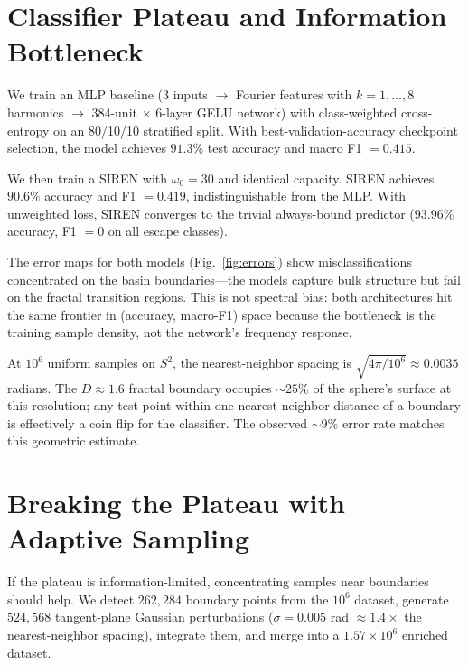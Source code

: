 \documentclass[twocolumn,prl]{revtex4-2}
\begin{document}
\section{Classifier Plateau and Information Bottleneck}
\label{sec:plateau}

We train an MLP baseline (3 inputs $\to$ Fourier features with $k =
1, \ldots, 8$ harmonics $\to$ 384-unit $\times$ 6-layer GELU network)
with class-weighted cross-entropy on an 80/10/10 stratified split. With
best-validation-accuracy checkpoint selection, the model achieves
$91.3\%$ test accuracy and macro F1 $= 0.415$.

We then train a SIREN \cite{Sitzmann2020} with $\omega_0 = 30$ and
identical capacity. SIREN achieves $90.6\%$ accuracy and F1 $= 0.419$,
indistinguishable from the MLP. With unweighted loss, SIREN converges to
the trivial always-bound predictor ($93.96\%$ accuracy, F1 $= 0$ on all
escape classes).

The error maps for both models (Fig.~\ref{fig:errors}) show
misclassifications concentrated on the basin boundaries---the models
capture bulk structure but fail on the fractal transition regions. This
is not spectral bias: both architectures hit the same frontier in
(accuracy, macro-F1) space because the bottleneck is the training sample
density, not the network's frequency response.

At $10^6$ uniform samples on $S^2$, the nearest-neighbor spacing is
$\sqrt{4\pi/10^6} \approx 0.0035$ radians. The $D \approx 1.6$ fractal
boundary occupies ${\sim}25\%$ of the sphere's surface at this
resolution; any test point within one nearest-neighbor distance of a
boundary is effectively a coin flip for the classifier. The observed
${\sim}9\%$ error rate matches this geometric estimate.


\section{Breaking the Plateau with Adaptive Sampling}
\label{sec:adaptive}

If the plateau is information-limited, concentrating samples near
boundaries should help. We detect $262{,}284$ boundary points from the
$10^6$ dataset, generate $524{,}568$ tangent-plane Gaussian perturbations
($\sigma = 0.005$ rad $\approx 1.4\times$ the nearest-neighbor spacing),
integrate them, and merge into a $1.57 \times 10^6$ enriched dataset.
\end{document}
